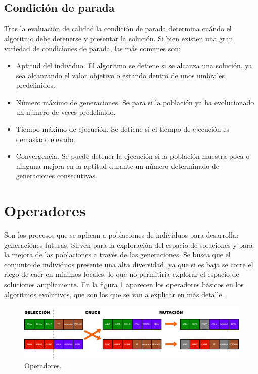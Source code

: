 \subsection{Condición de parada}

Tras la evaluación de calidad la condición de parada determina cuándo el algoritmo debe detenerse y presentar la solución. Si bien existen una gran variedad de condiciones de parada, las más comunes son:

\begin{itemize}
  \item Aptitud del individuo. El algoritmo se detiene si se alcanza una solución, ya sea alcanzando el valor objetivo o estando dentro de unos umbrales predefinidos.
  \item Número máximo de generaciones. Se para si la población ya ha evolucionado un número de veces predefinido.
  \item Tiempo máximo de ejecución. Se detiene si el tiempo de ejecución es demasiado elevado.
  \item Convergencia. Se puede detener la ejecución si la población muestra poca o ninguna mejora en la aptitud durante un número determinado de generaciones consecutivas.
\end{itemize}

\section{Operadores}

Son los procesos que se aplican a poblaciones de individuos para desarrollar generaciones futuras. Sirven para la exploración del espacio de soluciones y para la mejora de las poblaciones a través de las generaciones. Se busca que el conjunto de individuos presente una alta diversidad, ya que si es baja se corre el riego de caer en mínimos locales, lo que no permitiría explorar el espacio de soluciones ampliamente. En la figura \ref{fig:operadores} aparecen los operadores básicos en los algoritmos evolutivos, que son los que se van a explicar en más detalle.

\begin{figure}[H]
  \centering
  \includegraphics[width=1\textwidth]{figures/operadores.png}
  \caption{Operadores.}
  \label{fig:operadores}
\end{figure}
\newpage
